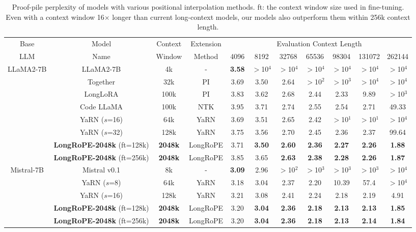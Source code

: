 \begin{table}[ht]
	\centering
	\fontsize{8}{8} \selectfont
	\caption{Proof-pile perplexity of models with various positional interpolation methods.  ft: the context window size used in fine-tuning. Even with a context window 16$\times$ longer than current long-context models, our models also outperform them within 256k context length.}
	\label{tbl:proof-pile}
	\begin{tabular}
		{ccccccccccc}
		\toprule
		Base& Model& Context &  Extension& \multicolumn{7}{c}{Evaluation Context Length}\\
		LLM		&Name&Window&Method&4096&8192&32768&65536&98304&131072&262144\\
		\hline
		\multirow{8}{*}{LLaMA2-7B}& LLaMA2-7B& 4k&- &\bf 3.58 &$>$10$^4$&$>$10$^4$&$>$10$^4$&$>$10$^4$&$>$10$^4$&$>$10$^4$\\
		& Together&32k&PI&3.69& 3.50&2.64&$>$10$^2$&$>$10$^3$&$>$10$^4$&$>$10$^4$\\
		&LongLoRA&100k&PI&3.83& 3.62 &2.68 & 2.44& 2.33& 9.89&$>$10$^3$\\
		&Code LLaMA& 100k& NTK &3.95&3.71&2.74&2.55&2.54&2.71&49.33\\
		&YaRN ($s$=16)&64k&YaRN&3.69& 3.51&2.65&2.42&$>$10$^1$&$>$10$^1$&$>$10$^4$\\
		&YaRN ($s$=32)&128k&YaRN&3.75&3.56&2.70&2.45&2.36&2.37&99.64\\
		&\textbf{LongRoPE-2048k} (ft=128k) &\bf 2048k&LongRoPE &3.71&\bf 3.50 & \bf 2.60& \bf 2.36&\bf2.27  &\bf 2.26 &\bf 1.88\\
		&\textbf{LongRoPE-2048k} (ft=256k) &\bf 2048k&LongRoPE &3.85&3.65 &\bf 2.63 & \bf 2.38& \bf 2.28& \bf 2.26&\bf 1.87\\
		\hline
		\multirow{5}{*}{Mistral-7B}&{Mistral v0.1}&8k&-&\bf 3.09&2.96&$>$10$^2$&$>$10$^3$&$>$10$^3$ & $>$10$^3$&$>$10$^4$\\
		&YaRN ($s$=8) &64k& YaRN&3.18& 3.04&2.37 & 2.20& 10.39&57.4&$>$10$^4$\\
		&YaRN ($s$=16) & 128k & YaRN &3.21& 3.08&2.41 & 2.24&2.18 & 2.19 &4.91\\
		&\textbf{LongRoPE-2048k} (ft=128k)&\bf2048k&LongRoPE &3.20&\bf 3.04&\bf 2.36 &\bf 2.18 &\bf 2.13 &\bf 2.13 &\bf 1.85\\
		&\textbf{LongRoPE-2048k} (ft=256k)  &\bf2048k&LongRoPE &3.20&\bf 3.04 &\bf 2.36 &\bf 2.18 &\bf 2.13 &\bf 2.14 &\bf 1.84\\
		\hline
	\end{tabular}
\end{table}

